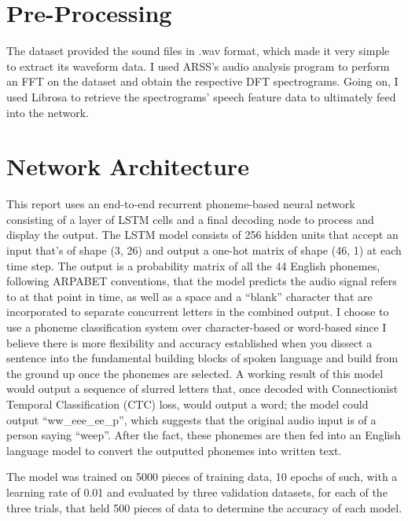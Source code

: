 \section{Pre-Processing}

The dataset provided the sound files in .wav format, which made it very simple to extract its waveform data. I used ARSS’s audio analysis program to perform an FFT on the dataset and obtain the respective DFT spectrograms. Going on, I used Librosa to retrieve the spectrograms' speech feature data to ultimately feed into the network.

\section{Network Architecture}

This report uses an end-to-end recurrent phoneme-based neural network consisting of a layer of LSTM cells and a final decoding node to process and display the output. The LSTM model consists of 256 hidden units that accept an input that’s of shape (3, 26) and output a one-hot matrix of shape (46, 1) at each time step. The output is a probability matrix of all the 44 English phonemes, following ARPABET conventions, that the model predicts the audio signal refers to at that point in time, as well as a space and a “blank” character that are incorporated to separate concurrent letters in the combined output. I choose to use a phoneme classification system over character-based or word-based since I believe there is more flexibility and accuracy established when you dissect a sentence into the fundamental building blocks of spoken language and build from the ground up once the phonemes are selected. A working result of this model would output a sequence of slurred letters that, once decoded with Connectionist Temporal Classification (CTC) loss, would output a word; the model could output “ww\_eee\_ee\_p”, which suggests that the original audio input is of a person saying “weep”. After the fact, these phonemes are then fed into an English language model to convert the outputted phonemes into written text.
\newline\par
The model was trained on 5000 pieces of training data, 10 epochs of such, with a learning rate of 0.01 and evaluated by three validation datasets, for each of the three trials, that held 500 pieces of data to determine the accuracy of each model.

